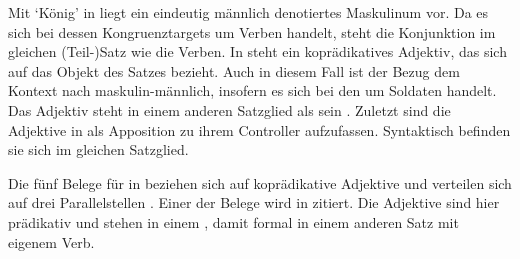 
Mit  `König' in  liegt ein eindeutig
männlich denotiertes Maskulinum vor. Da es sich bei dessen
Kongruenztargets um Verben handelt, steht die Konjunktion im gleichen
(Teil-)Satz wie die Verben. In  steht ein
koprädikatives Adjektiv, das sich auf das Objekt des
Satzes bezieht. Auch in diesem Fall ist der Bezug dem Kontext nach
maskulin-männlich, insofern es sich bei den  um Soldaten
handelt. Das Adjektiv steht in einem anderen Satzglied als sein
. Zuletzt sind die Adjektive in 
als Apposition zu ihrem Controller aufzufassen. Syntaktisch
befinden sie sich im gleichen Satzglied.

Die fünf Belege für  in  beziehen sich auf
koprädikative Adjektive und verteilen sich auf drei
Parallelstellen%
. Einer der Belege wird in  zitiert. Die Adjektive sind
hier prädikativ und stehen in einem , damit formal in einem
anderen Satz mit eigenem Verb.

